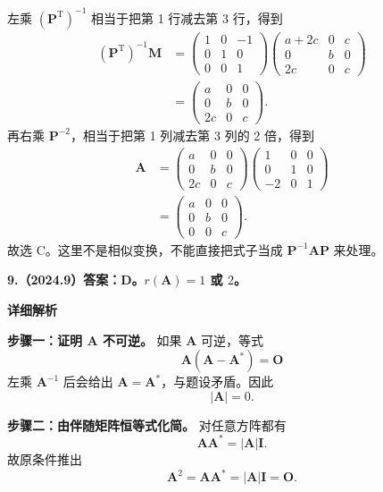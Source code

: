 \documentclass[UTF8,11pt,fontset=windows]{ctexart}
\begin{document}
左乘 $(\boldsymbol P^{\mathrm T})^{-1}$ 相当于把第 1 行减去第 3 行，得到
$$
\begin{aligned}
(\boldsymbol P^{\mathrm T})^{-1}\boldsymbol M
&=\begin{pmatrix}1&0&-1\\0&1&0\\0&0&1\end{pmatrix}
\begin{pmatrix}a+2c&0&c\\0&b&0\\2c&0&c\end{pmatrix}\\[3pt]
&=\begin{pmatrix}a&0&0\\0&b&0\\2c&0&c\end{pmatrix}.
\end{aligned}
$$
再右乘 $\boldsymbol P^{-2}$，相当于把第 1 列减去第 3 列的 2 倍，得到
$$
\begin{aligned}
\boldsymbol A
&=\begin{pmatrix}a&0&0\\0&b&0\\2c&0&c\end{pmatrix}
\begin{pmatrix}1&0&0\\0&1&0\\-2&0&1\end{pmatrix}\\[3pt]
&=\begin{pmatrix}a&0&0\\0&b&0\\0&0&c\end{pmatrix}.
\end{aligned}
$$
故选 C。这里不是相似变换，不能直接把式子当成 $\boldsymbol P^{-1}\boldsymbol A\boldsymbol P$ 来处理。

\clearpage

\textbf{9.（2024.9）答案：D。$r(\boldsymbol A)=1$ 或 $2$。}

\textbf{详细解析}

\textbf{步骤一：证明 $\boldsymbol A$ 不可逆。} 如果 $\boldsymbol A$ 可逆，等式
$$
\boldsymbol A(\boldsymbol A-\boldsymbol A^*)=\boldsymbol O
$$
左乘 $\boldsymbol A^{-1}$ 后会给出 $\boldsymbol A=\boldsymbol A^*$，与题设矛盾。因此
$$
|\boldsymbol A|=0.
$$

\textbf{步骤二：由伴随矩阵恒等式化简。} 对任意方阵都有
$$
\boldsymbol A\boldsymbol A^*=|\boldsymbol A|\boldsymbol I.
$$
故原条件推出
$$
\boldsymbol A^2=\boldsymbol A\boldsymbol A^*
=|\boldsymbol A|\boldsymbol I=\boldsymbol O.
$$
\end{document}
